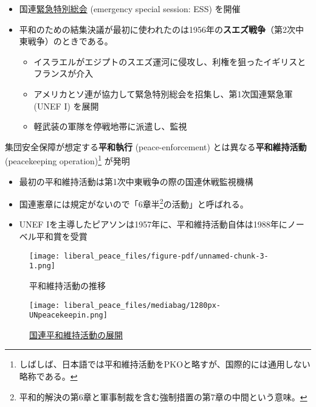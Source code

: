 \documentclass[
  xelatex,
  ja=standard]{bxjsarticle}
\providecommand{\tightlist}{%
  \setlength{\itemsep}{0pt}\setlength{\parskip}{0pt}}\usepackage{longtable,booktabs,array}
\begin{document}
\begin{itemize}
\tightlist
\item
  国連\href{https://www.un.org/en/ga/sessions/emergency.shtml}{緊急特別総会}
  (emergency special session: ESS) を開催
\item
  平和のための結集決議が最初に使われたのは1956年の\textbf{スエズ戦争}（第2次中東戦争）のときである。

  \begin{itemize}
  \tightlist
  \item
    イスラエルがエジプトのスエズ運河に侵攻し、利権を狙ったイギリスとフランスが介入
  \item
    アメリカとソ連が協力して緊急特別総会を招集し、第1次国連緊急軍 (UNEF
    I) を展開
  \item
    軽武装の軍隊を停戦地帯に派遣し、監視
  \end{itemize}
\end{itemize}

集団安全保障が想定する\textbf{平和執行} (peace-enforcement)
とは異なる\textbf{平和維持活動} (peacekeeping operation)\footnote{しばしば、日本語では平和維持活動をPKOと略すが、国際的には通用しない略称である。}
が発明

\begin{itemize}
\tightlist
\item
  最初の平和維持活動は第1次中東戦争の際の国連休戦監視機構
\item
  国連憲章には規定がないので「6章半\footnote{平和的解決の第6章と軍事制裁を含む強制措置の第7章の中間という意味。}の活動」と呼ばれる。
\item
  UNEF
  Iを主導したピアソンは1957年に、平和維持活動自体は1988年にノーベル平和賞を受賞
\end{itemize}

\begin{figure}[htpb]

{\centering \texttt{[image: liberal\_peace\_files/figure-pdf/unnamed-chunk-3-1.png]}

}

\caption{平和維持活動の推移}

\end{figure}

\begin{figure}[htpb]

{\centering \texttt{[image: liberal\_peace\_files/mediabag/1280px-UNpeacekeepin.png]}

}

\caption{\href{https://commons.wikimedia.org/wiki/File:UNpeacekeeping.svg}{国連平和維持活動の展開}}

\end{figure}
\end{document}
